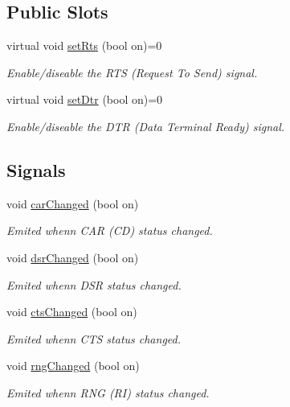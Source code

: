 \subsection*{Public Slots}
\begin{DoxyCompactItemize}
\item 
virtual void \hyperlink{classmdt_abstract_serial_port_a0ef2426fbd1afbcb0701f327cc16a7cc}{set\-Rts} (bool on)=0
\begin{DoxyCompactList}\small\item\em Enable/diseable the R\-T\-S (Request To Send) signal. \end{DoxyCompactList}\item 
virtual void \hyperlink{classmdt_abstract_serial_port_aa86a8bc0bb03ac2b07bf43968dfeb189}{set\-Dtr} (bool on)=0
\begin{DoxyCompactList}\small\item\em Enable/diseable the D\-T\-R (Data Terminal Ready) signal. \end{DoxyCompactList}\end{DoxyCompactItemize}
\subsection*{Signals}
\begin{DoxyCompactItemize}
\item 
void \hyperlink{classmdt_abstract_serial_port_a63ddcadf5d8a63c479b0b6a24f89c837}{car\-Changed} (bool on)
\begin{DoxyCompactList}\small\item\em Emited whenn C\-A\-R (C\-D) status changed. \end{DoxyCompactList}\item 
void \hyperlink{classmdt_abstract_serial_port_a077d8c39ed12713742f1f2ffa0dca11d}{dsr\-Changed} (bool on)
\begin{DoxyCompactList}\small\item\em Emited whenn D\-S\-R status changed. \end{DoxyCompactList}\item 
void \hyperlink{classmdt_abstract_serial_port_adf45a5006218ef5660721ecdf8454b5d}{cts\-Changed} (bool on)
\begin{DoxyCompactList}\small\item\em Emited whenn C\-T\-S status changed. \end{DoxyCompactList}\item 
void \hyperlink{classmdt_abstract_serial_port_a47c08ccb99dc6de76ae58ebeefc26857}{rng\-Changed} (bool on)
\begin{DoxyCompactList}\small\item\em Emited whenn R\-N\-G (R\-I) status changed. \end{DoxyCompactList}\end{DoxyCompactItemize}
